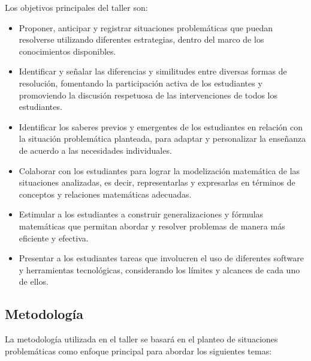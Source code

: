 Los objetivos principales del taller son: 
\begin{itemize}
	\item Proponer, anticipar y registrar situaciones problemáticas que puedan resolverse utilizando diferentes estrategias, dentro del marco de los conocimientos disponibles.
	\item Identificar y señalar las diferencias y similitudes entre diversas formas de resolución, fomentando la participación activa de los estudiantes y promoviendo la discusión respetuosa de las intervenciones de todos los estudiantes.
	\item Identificar los saberes previos y emergentes de los estudiantes en relación con la situación problemática planteada, para adaptar y personalizar la enseñanza de acuerdo a las necesidades individuales.
	\item Colaborar con los estudiantes para lograr la modelización matemática de las situaciones analizadas, es decir, representarlas y expresarlas en términos de conceptos y relaciones matemáticas adecuadas.
	\item Estimular a los estudiantes a construir generalizaciones y fórmulas matemáticas que permitan abordar y resolver problemas de manera más eficiente y efectiva.
	\item Presentar a los estudiantes tareas que involucren el uso de diferentes software y herramientas tecnológicas, considerando los límites y alcances de cada uno de ellos.
\end{itemize}

\subsection{Metodología}

La metodología utilizada en el taller se basará en el planteo de situaciones problemáticas como enfoque principal para abordar los siguientes temas:

